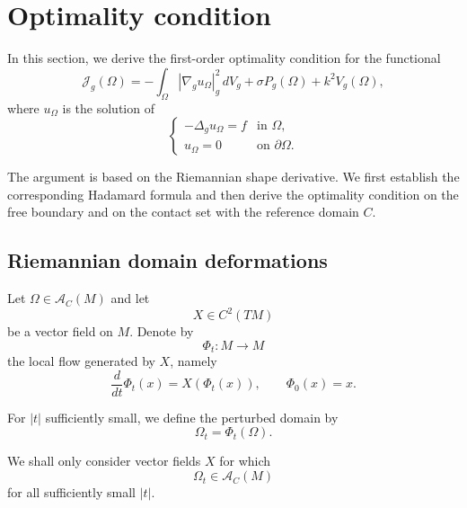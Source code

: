 \documentclass{article}
\begin{document}
\section{Optimality condition}
\label{sec:optimality}

In this section, we derive the first-order optimality condition for
the functional
\begin{equation}
\mathcal J_g(\Omega)
=
-\int_\Omega |\nabla_g u_\Omega|_g^2\,dV_g
+\sigma P_g(\Omega)
+k^2V_g(\Omega),
\label{eq:Jg-optimality}
\end{equation}
where $u_\Omega$ is the solution of
\begin{equation}
\begin{cases}
-\Delta_g u_\Omega=f & \text{in }\Omega,\\
u_\Omega=0 & \text{on }\partial\Omega.
\end{cases}
\label{eq:state-optimality}
\end{equation}

The argument is based on the Riemannian shape derivative. We first
establish the corresponding Hadamard formula and then derive the
optimality condition on the free boundary and on the contact set with
the reference domain $C$.


\subsection{Riemannian domain deformations}
\label{subsec:riemannian-deformations}

Let $\Omega\in\mathcal A_C(M)$ and let
\[
X\in C^2(TM)
\]
be a vector field on $M$. Denote by
\[
\Phi_t:M\longrightarrow M
\]
the local flow generated by $X$, namely
\begin{equation}
\frac{d}{dt}\Phi_t(x)
=
X(\Phi_t(x)),
\qquad
\Phi_0(x)=x.
\label{eq:flow}
\end{equation}

For $|t|$ sufficiently small, we define the perturbed domain by
\begin{equation}
\Omega_t=\Phi_t(\Omega).
\label{eq:perturbed-domain}
\end{equation}

We shall only consider vector fields $X$ for which
\[
\Omega_t\in\mathcal A_C(M)
\]
for all sufficiently small $|t|$.
\end{document}
